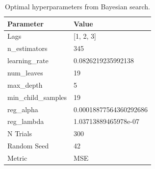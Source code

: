 \begin{table}
\caption{Optimal hyperparameters from Bayesian search.}
\label{tab:01_best_params}
\begin{tabular}{ll}
\toprule
Parameter & Value \\
\midrule
Lags & [1, 2, 3] \\
n\_estimators & 345 \\
learning\_rate & 0.0826219235992138 \\
num\_leaves & 19 \\
max\_depth & 5 \\
min\_child\_samples & 19 \\
reg\_alpha & 0.00018877564360292686 \\
reg\_lambda & 1.03713889465978e-07 \\
N Trials & 300 \\
Random Seed & 42 \\
Metric & MSE \\
\bottomrule
\end{tabular}
\end{table}

